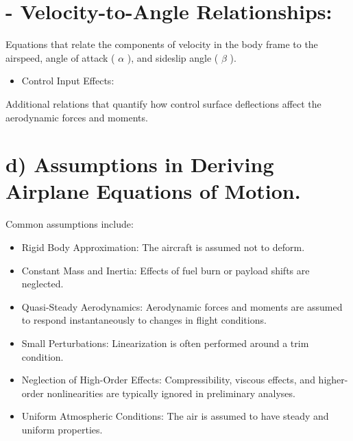 \documentclass[10pt]{article}
\begin{document}
\section*{- Velocity-to-Angle Relationships:}
Equations that relate the components of velocity in the body frame to the airspeed, angle of attack ( $\alpha$ ), and sideslip angle ( $\beta$ ).

\begin{itemize}
  \item Control Input Effects:
\end{itemize}

Additional relations that quantify how control surface deflections affect the aerodynamic forces and moments.

\section*{d) Assumptions in Deriving Airplane Equations of Motion.}
Common assumptions include:

\begin{itemize}
  \item Rigid Body Approximation: The aircraft is assumed not to deform.
  \item Constant Mass and Inertia: Effects of fuel burn or payload shifts are neglected.
  \item Quasi-Steady Aerodynamics: Aerodynamic forces and moments are assumed to respond instantaneously to changes in flight conditions.
  \item Small Perturbations: Linearization is often performed around a trim condition.
  \item Neglection of High-Order Effects: Compressibility, viscous effects, and higher-order nonlinearities are typically ignored in preliminary analyses.
  \item Uniform Atmospheric Conditions: The air is assumed to have steady and uniform properties.
\end{itemize}
\end{document}
